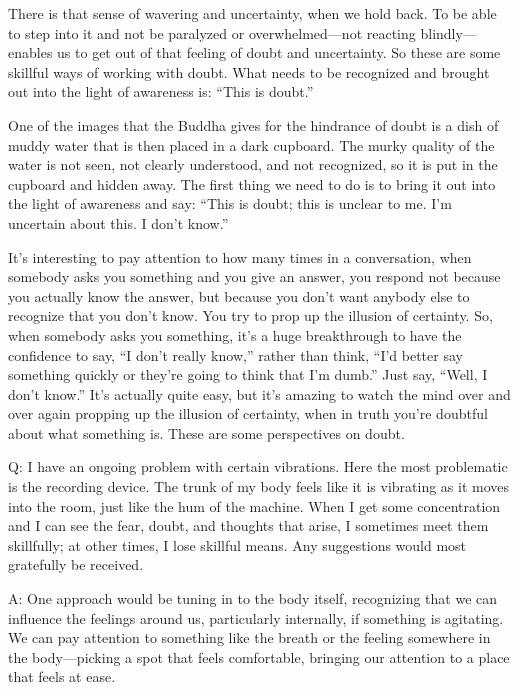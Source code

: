 There is that sense of wavering and uncertainty, when we hold back. To
be able to step into it and not be paralyzed or overwhelmed—not reacting
blindly—enables us to get out of that feeling of doubt and uncertainty.
So these are some skillful ways of working with doubt. What needs to be
recognized and brought out into the light of awareness is: “This is
doubt.”

One of the images that the Buddha gives for the hindrance of doubt is a
dish of muddy water that is then placed in a dark cupboard. The murky
quality of the water is not seen, not clearly understood, and not
recognized, so it is put in the cupboard and hidden away. The first
thing we need to do is to bring it out into the light of awareness and
say: “This is doubt; this is unclear to me. I’m uncertain about this. I
don’t know.”

It’s interesting to pay attention to how many times in a conversation,
when somebody asks you something and you give an answer, you respond not
because you actually know the answer, but because you don’t want anybody
else to recognize that you don’t know. You try to prop up the illusion
of certainty. So, when somebody asks you something, it’s a huge
breakthrough to have the confidence to say, “I don’t really know,”
rather than think, “I’d better say something quickly or they’re going to
think that I’m dumb.” Just say, “Well, I don’t know.” It’s actually
quite easy, but it’s amazing to watch the mind over and over again
propping up the illusion of certainty, when in truth you’re doubtful
about what something is. These are some perspectives on doubt.

\vspace{\the\qaskip}
Q: I have an ongoing problem with certain vibrations. Here the most
problematic is the recording device. The trunk of my body feels like it
is vibrating as it moves into the room, just like the hum of the
machine. When I get some concentration and I can see the fear, doubt,
and thoughts that arise, I sometimes meet them skillfully; at other
times, I lose skillful means. Any suggestions would most gratefully be
received.

\vspace{\the\qaskip}
A: One approach would be tuning in to the body itself, recognizing that
we can influence the feelings around us, particularly internally, if
something is agitating. We can pay attention to something like the
breath or the feeling somewhere in the body—picking a spot that feels
comfortable, bringing our attention to a place that feels at ease.

